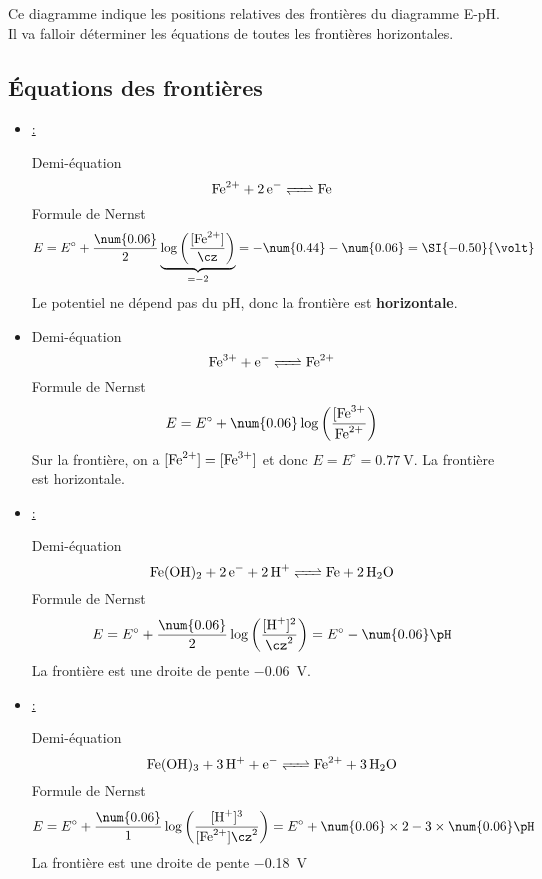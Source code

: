 \documentclass{cours}
\begin{document}
Ce diagramme indique les positions relatives des frontières du diagramme E-pH. Il va falloir déterminer les équations de toutes les frontières horizontales.

\subsection{Équations des frontières}%
\label{sub:equations_des_frontieres}
\begin{itemize}
  \item \underline{ : } 

  Demi-équation 
\begin{equation}
  \ce{Fe^2+ + 2e- <=> Fe}
\end{equation}
Formule de Nernst
  \begin{equation}
    E = E^\circ + \frac{\num{0.06}}{2}\underbrace{\log\left( \frac{[\ce{Fe^2+}]}{\cz}\right)}_{=-2} = -\num{0.44}-\num{0.06} = \SI{-0.50}{\volt} 
  \end{equation}
  Le potentiel ne dépend pas du pH, donc la frontière est \textbf{horizontale}.

\item \underline{}

Demi-équation
\begin{equation}
  \ce{Fe^3+ + e- <=> Fe^2+}
\end{equation}
Formule de Nernst
\begin{equation}
E = E^\circ + \num{0.06} \log \left( \frac{[\ce{Fe^3+}}{\ce{Fe^2+}} \right) 
\end{equation}
Sur la frontière, on a $[\ce{Fe^2+}]=[\ce{Fe^3+}]$ et donc $E = E^\circ = \SI{0.77}{\volt}$. La frontière est horizontale.

  \item \underline{ : } 

Demi-équation 
\begin{equation}
\ce{Fe(OH)2 + 2e- + 2H+ <=> Fe + 2H2O}
\end{equation}
Formule de Nernst
\begin{equation}
  E = E^\circ + \frac{\num{0.06}}{2}\log \left( \frac{[\ce{H+}]^2}{\cz^2} \right) = E^\circ -   \num{0.06}\pH
\end{equation}
La frontière est une droite de pente \SI{-0.06}{\volt}.

\item \underline{ : }

Demi-équation
\begin{equation}
  \ce{Fe(OH)3 +  3H+ + e- <=> Fe^2+ + 3H2O}
\end{equation}
Formule de Nernst
\begin{equation}
  E = E^\circ + \frac{\num{0.06}}{1}\log \left( \frac{[\ce{H+}]^3}{[\ce{Fe^2+]\cz^2}} \right) = E^\circ + \num{0.06}\times 2 -3\times \num{0.06} \pH 
\end{equation}
La frontière est une droite de pente \SI{-0.18}{\volt}


\end{itemize}
\end{document}
